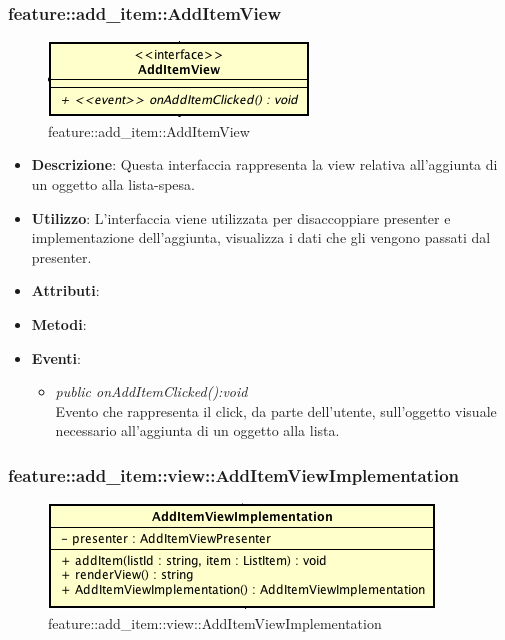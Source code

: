 \subsubsection{feature::add\_item::AddItemView}

\label{feature::add_item::AddItemView}
\begin{figure}[ht]
	\centering
	\includegraphics[scale=0.5]{Sezioni/SottosezioniST/img/app/AddItemView.png}
	\caption{feature::add\_item::AddItemView}
\end{figure}

\begin{itemize}
\item \textbf{Descrizione}: Questa interfaccia rappresenta la view relativa all'aggiunta di un oggetto alla lista-spesa.
\item \textbf{Utilizzo}: L'interfaccia viene utilizzata per disaccoppiare presenter e implementazione dell'aggiunta, visualizza i dati che gli vengono passati dal presenter.
\item \textbf{Attributi}: 
\item \textbf{Metodi}:
\item \textbf{Eventi}:
	\begin{itemize}	
	\item \textit{public onAddItemClicked():void}\\
	Evento che rappresenta il click, da parte dell'utente, sull'oggetto visuale necessario all'aggiunta di un oggetto alla lista.
	\end{itemize}
\end{itemize}

\subsubsection{feature::add\_item::view::AddItemViewImplementation}

\label{feature::add_item::view::AddItemViewImplementation}
\begin{figure}[ht]
	\centering
	\includegraphics[scale=0.5]{Sezioni/SottosezioniST/img/app/AddItemViewImplementation.png}
	\caption{feature::add\_item::view::AddItemViewImplementation}
\end{figure}


